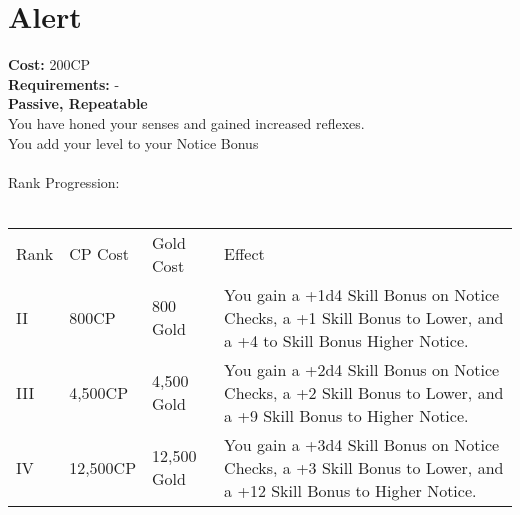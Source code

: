 \section{Alert}\label{perk:alert}
\textbf{Cost:} 200CP\\
\textbf{Requirements:} -\\
\textbf{Passive, Repeatable}\\
You have honed your senses and gained increased reflexes.\\
You add your level to your Notice Bonus\\
\\
Rank Progression:\\
\\
\begin{longtable}{l | l | l | p{9cm}}
	Rank & CP Cost & Gold Cost & Effect\\
	II & 800CP & 800 Gold & You gain a +1d4 Skill Bonus on Notice Checks, a +1 Skill Bonus to Lower, and a +4 to Skill Bonus Higher Notice.\\
	III & 4,500CP & 4,500 Gold & You gain a +2d4 Skill Bonus on Notice Checks, a +2 Skill Bonus to Lower, and a +9 Skill Bonus to Higher Notice.\\
	IV & 12,500CP & 12,500 Gold & You gain a +3d4 Skill Bonus on Notice Checks, a +3 Skill Bonus to Lower, and a +12 Skill Bonus to Higher Notice.\\
\end{longtable}
